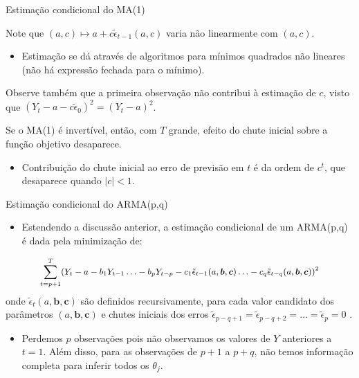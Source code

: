 \documentclass[11pt]{beamer}
\newenvironment{halfwideitemize}{\itemize\addtolength{\itemsep}{0.5em}}{\enditemize}
\begin{document}
\begin{frame}{Estimação condicional do MA(1)}
	\begin{halfwideitemize}
\item Note que $(a,c)\mapsto a + c\tilde{\epsilon}_{t-1}(a,c)$ varia não linearmente com $(a,c)$.
\begin{itemize}
	\item Estimação se dá através de algoritmos para mínimos quadrados não lineares (não há  expressão fechada para o mínimo).
\end{itemize}
\item Observe também que a primeira observação não contribui à estimação de $c$, visto que $(Y_t - a - c\tilde{\epsilon}_0)^2 = (Y_t - a)^2$.
\item Se o MA(1) é {\color{blue}invertível}, então, com $T$ grande, efeito do chute inicial sobre a função objetivo desaparece.
\begin{itemize}
	\item Contribuição do chute inicial ao erro de previsão em $t$ é da ordem de $c^t$, que desaparece quando $|c| < 1$. 
\end{itemize}
	\end{halfwideitemize}
\end{frame}

\begin{frame}{Estimação condicional do ARMA(p,q)}
	\begin{itemize}
		\item Estendendo a discussão anterior, a estimação condicional de um ARMA(p,q) é dada pela minimização de:
\end{itemize}
		\begin{equation*}
			\small  \sum_{t= p+1}^{T}(Y_t -a -  b_1 Y_{t-1}  \ldots - b_p Y_{t-p} -  c_1\tilde{\epsilon}_{t-1}(a,\boldsymbol{b},\boldsymbol{c}) \ldots -c_q \tilde{\epsilon}_{t-q}(a,\boldsymbol{b},\boldsymbol{c})  )^2
\end{equation*}
onde $\tilde{\epsilon}_t(a,\boldsymbol{b},\boldsymbol{c})$ são definidos recursivamente, para cada valor candidato dos parâmetros $(a,\boldsymbol{b},\boldsymbol{c})$ e chutes iniciais dos erros $\tilde{\epsilon}_{p-q+1} = \tilde{\epsilon}_{p-q+2} = \ldots = \tilde{\epsilon}_{p} =0$ .
\begin{itemize}
	\item Perdemos $p$ observações pois não observamos os valores de $Y$ anteriores a $t=1$. Além disso, para as observações de $p+1$ a $p+q$, não temos informação completa para inferir todos os $\theta_j$.
\end{itemize}
\end{frame}
\end{document}
